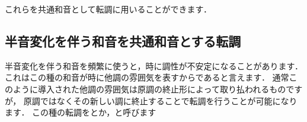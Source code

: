\documentclass[dvipdfmx,uplatex,b5paper,openany,jbase=12Q,nomag*,textwidth-limit=44%
               ]{gachimuchi}[2020/05/05]
\begin{document}
\begin{Music}[.6\linewidth]
  \nostartrule%
  \Startpiece
  \znotes{}\en%
  \Notes%
  \zchordsl{\Gni}\zchordsll{\bFlat\Gniii}%
  \en\setdoublebar{}\ignorenats\changecontext%
  \znotes{}\en%
  \Notes%
  \zchordsl{\Gniv}\zchordsll{\bFlat\Gnvi}%
  \en\setdoublebar{}\ignorenats\changecontext%
  \znotes{}\en%
  \Notes%
  \zchordsl{\Gnv}\zchordsll{\bFlat\Gnvii}%
  \en\setdoublebar{}\ignorenats\changecontext%
  \znotes{}\en%
  \Notes%
  \zchordsl{\Gnv}%
  \en\setdoublebar%
  \endpiece
  \Startpiece
  \znotes{}\en%
  \Notes%
  \zchordsl{\Gni\Min}\zchordsll{\Gnvi\Min}%
  \en\setdoublebar{}\ignorenats\changecontext%
  \en%
  \Notes%
  \zchordsl{\Gniv\Min}\zchordsll{\Gnii\Min}%
  \en\setdoublebar{}\ignorenats\changecontext%
  \znotes{}\en%
  \Notes%
  \zchordsl{\Gnv\Min}\zchordsll{\Gniii\Min}%
  \en\setdoublebar{}\ignorenats\changecontext%
  \znotes{}\en%
  \Notes%
  \zchordsl{\Gniv\Min}%
  \en\setdoublebar%
  \endpiece
  \Startpiece
  \znotes{}\en%
  \Notes%
  \zchordsl{\Gnvii\Dimt}\zchordsll{\Gnii\Dimt}%
  \en\setdoublebar{}\ignorenats\changecontext%
  \znotes{}\en%
  \Notes%
  \zchordsl{\Gnii\Dimt}%
  \en\setdoublebar%
  \endpiece%
  \Startpiece%
  \znotes{}\en%
  \Notes%
  \zchordsl{\bFlat\Gniii\Aug}%
  \en\setdoublebar{}\ignorenats\changecontext%
  \znotes{}\en%
  \Notes%
  \zchordsl{\bFlat\Gnvi\Aug}%
  \en\setdoublebar%
  \endpiece
\end{Music}

これらを共通和音として転調に用いることができます．


\subsection{半音変化を伴う和音を共通和音とする転調}
半音変化を伴う和音を頻繁に使うと，時に調性が不安定になることがあります．
これはこの種の和音が時に他調の雰囲気を表すからであると言えます．
通常このように導入された他調の雰囲気は原調の終止形によって取り払われるものですが，
原調ではなくその新しい調に終止することで転調を行うことが可能になります．
この種の転調をとか，と呼びます
\end{document}
